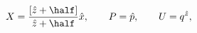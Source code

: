 \begin{equation}
\label{Eq:P-p}
X= \frac{[\hat z+\half]}{\hat z+\half}\hat x,  \qquad
P=\hat p, \qquad
U= q^{\hat z},
\end{equation}

